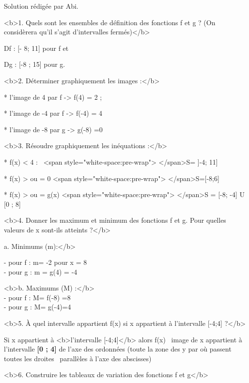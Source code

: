 \begin{corrige}
     Solution rédigée par Abi.
\par
     <b>1. Quels sont les ensembles de définition des fonctions f et g ? (On considèrera qu'il s'agit d'intervalles fermés)</b>
\par
     Df : [- 8; 11] pour f et~
     \par
     Dg : [-8 ; 15] pour g.
\par
     <b>2. Déterminer graphiquement les images :</b>
\par
     * l'image de 4 par f -> f(4) = 2 ; ~
     \par
     * l'image de -4 par f -> f(-4) = 4
     \par
     * l'image de -8 par g -> g(-8) =0
\par
     <b>3. Résoudre graphiquement les inéquations :</b>
\par
     * f(x) < 4 : ~<span style="white-space:pre-wrap">		</span>S= ]-4; 11]
     \par
     * f(x) > ou = 0 <span style="white-space:pre-wrap">		</span>S=[-8;6]
     \par
     * f(x) > ou = g(x) <span style="white-space:pre-wrap">	</span>S = [-8; -4] U [0 ; 8]
\par
     <b>4. Donner les maximum et minimum des fonctions f et g. Pour quelles valeurs de x sont-ils atteints ?</b>

\par a. Minimums (m):</b>
\par
 - pour f : m= -2 pour x = 8
\\- pour g : m = g(4) = -4
    
\par <b>b. Maximums (M) :</b>
\\ - pour f : M= f(-8) =8~
\\ - pour g : M= g(-4)=4~
\par
     <b>5. À quel intervalle appartient f(x) si x appartient à l'intervalle [-4;4] ?</b>
\par
     Si x appartient à <b>l'intervalle [-4;4]</b> alors f(x) ~image de x appartient à l'intervalle \textbf{[0 ; 4]} de l'axe des ordonnées (toute la zone des y par où passent toutes les droites ~parallèles à l'axe des abscisses)
\par
     <b>6. Construire les tableaux de variation des fonctions f et g</b>
\par
\begin{center}
\begin{extern}%
\end{extern}
\end{center}
\end{corrige}
